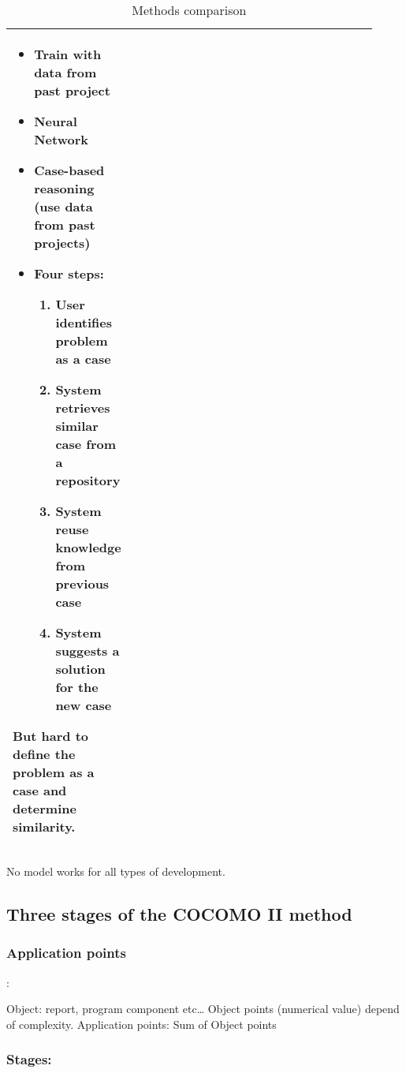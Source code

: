 \begin{table}[!ht]
\begin{tabular}{p{0.17\linewidth}p{0.75\linewidth}}
\begin{minipage}{\linewidth}
\begin{itemize}
        					\item Train with data from past project
        					\item Neural Network
                                \item Case-based reasoning (use data from past projects)
                                \item Four steps:
                                    \begin{enumerate}
                                        \item User identifies problem as a case
                                        \item System retrieves similar case from a
                                        repository
                                        \item System reuse knowledge from previous
                                        case
                                        \item System suggests a solution for the
                                        new case
                                    \end{enumerate}
                            \end{itemize}
                            But hard to define the problem as a case and
                            determine similarity.\end{minipage} \\
        \bottomrule
    \end{tabular}
    \caption{Methods comparison}
\end{table}

No model works for all types of development.

\subsection{Three stages of the COCOMO II method}

\subsubsection{Application points}:

Object: report, program component etc\ldots \newline
Object points (numerical value) depend of complexity. \newline
Application points: Sum of Object points

\subsubsection{Stages:}

